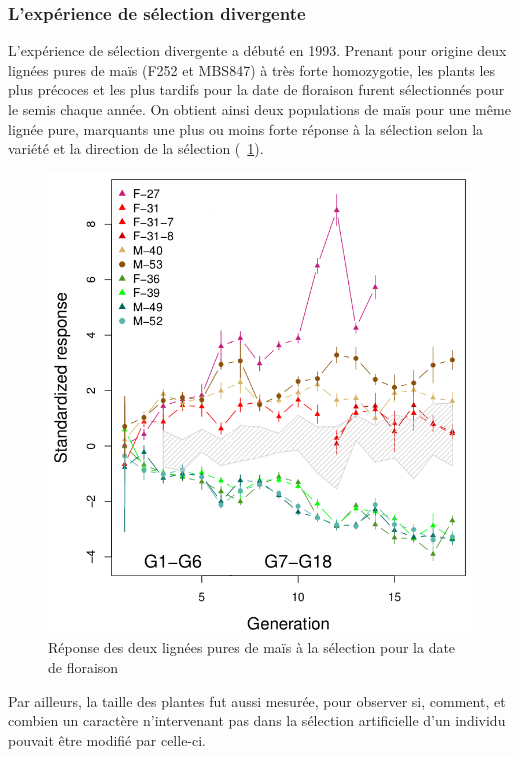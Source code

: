 \documentclass[12pt,a4paper]{article}
\begin{document}
			\subsubsection{L'expérience de sélection divergente}
			
				L'expérience de sélection divergente a débuté en 1993. Prenant pour origine deux lignées pures de maïs (F252 et MBS847) à très forte homozygotie, les plants les plus précoces et les plus tardifs pour la date de floraison furent sélectionnés pour le semis chaque année. On obtient ainsi deux populations de maïs pour une même lignée pure, marquants une plus ou moins forte réponse à la sélection selon la variété et la direction de la sélection (~\ref{sélection}).
				\begin{figure}
					\centering
					\includegraphics[width =\textwidth]{selection.png}
					\caption{Réponse des deux lignées pures de maïs à la sélection pour la date de floraison}
					\label{sélection}
				\end{figure}
				
				Par ailleurs, la taille des plantes fut aussi mesurée, pour observer si, comment, et combien un caractère n'intervenant pas dans la sélection artificielle d'un individu pouvait être modifié par celle-ci.
			
\end{document}
